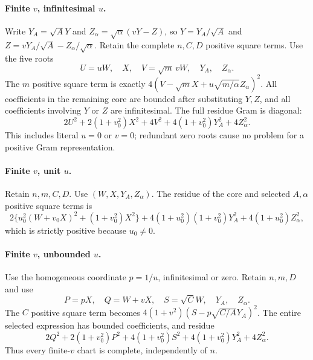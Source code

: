 \paragraph{Finite $v$, infinitesimal $u$.}
Write $Y_A=\sqrt A Y$ and $Z_\alpha=\sqrt\alpha(vY-Z)$, so
$Y=Y_A/\sqrt A$ and $Z=vY_A/\sqrt A-Z_\alpha/\sqrt\alpha$.
Retain the complete $n,C,D$ positive square terms. Use the five roots
\[
 U=uW,\quad X,\quad V=\sqrt m\,vW,\quad Y_A,\quad Z_\alpha.
\]
The $m$ positive square term is exactly
$4(V-\sqrt m X+u\sqrt{m/\alpha}Z_\alpha)^2$.
All coefficients in the remaining core are bounded after substituting
$Y,Z$, and all coefficients involving $Y$ or $Z$ are infinitesimal.
The full residue Gram is diagonal:
\[
 2U^2+2(1+v_0^2)X^2+4V^2
       +4(1+v_0^2)Y_A^2+4Z_\alpha^2.
\tag{IR1}
\]
This includes literal $u=0$ or $v=0$; redundant zero roots cause no
problem for a positive Gram representation.

\paragraph{Finite $v$, unit $u$.}
Retain $n,m,C,D$. Use $(W,X,Y_A,Z_\alpha)$.
The residue of the core and selected $A,\alpha$ positive square terms is
\[
 2\{u_0^2(W+v_0X)^2+(1+v_0^2)X^2\}
       +4(1+u_0^2)(1+v_0^2)Y_A^2
       +4(1+u_0^2)Z_\alpha^2,
\tag{IR2}
\]
which is strictly positive because $u_0\ne0$.

\paragraph{Finite $v$, unbounded $u$.}
Use the homogeneous coordinate $p=1/u$, infinitesimal or zero.
Retain $n,m,D$ and use
\[
 P=pX,\quad Q=W+vX,\quad S=\sqrt C W,\quad Y_A,\quad Z_\alpha.
\]
The $C$ positive square term becomes
$4(1+v^2)(S-p\sqrt{C/A}Y_A)^2$.
The entire selected expression has bounded coefficients, and residue
\[
 2Q^2+2(1+v_0^2)P^2+4(1+v_0^2)S^2
       +4(1+v_0^2)Y_A^2+4Z_\alpha^2.
\tag{IR3}
\]
Thus every finite-$v$ chart is complete, independently of $n$.

